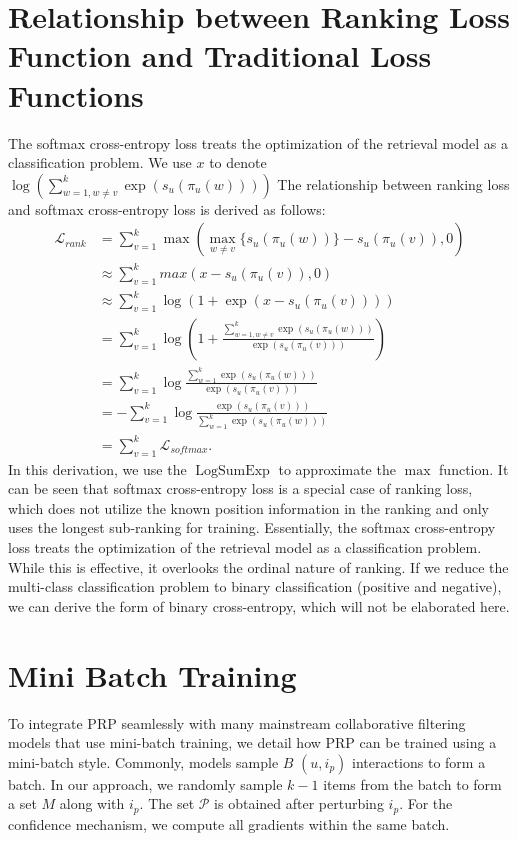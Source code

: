 \clearpage
\appendix
\section{Relationship between Ranking Loss Function and Traditional Loss Functions}
\label{app:relation}
The softmax cross-entropy loss treats the optimization of the retrieval model as a classification problem. We use $x$ to denote $\log(\sum_{w=1,w \neq v}^k \exp(s_u(\pi_{u}(w))))$ The relationship between ranking loss and softmax cross-entropy loss is derived as follows:
\begin{align}
    \mathcal{L}_{rank} &= \sum_{v=1}^{k} \max(\max_{w \neq v}\{s_u(\pi_{u}(w))\} - s_u(\pi_{u}(v)), 0) \\
    &\approx \sum_{v=1}^{k} max(x-s_u(\pi_{u}(v)),0) \\
    &\approx \sum_{v=1}^{k} \log(1 + \exp(x-s_u(\pi_{u}(v)))) \\
    & = \sum_{v=1}^{k} \log (1 + \frac{\sum_{w=1,w \neq v}^k \exp(s_u(\pi_{u}(w)))}{\exp(s_u(\pi_{u}(v)))}) \\
    & = \sum_{v=1}^{k} \log \frac{\sum_{w=1}^k \exp(s_u(\pi_{u}(w)))}{\exp(s_u(\pi_{u}(v)))}\\
    & = -\sum_{v=1}^{k} \log \frac{\exp(s_u(\pi_{u}(v)))}{\sum_{w=1}^k \exp(s_u(\pi_{u}(w)))} \\
    & = \sum_{v=1}^{k}\mathcal{L}_{softmax}.
\end{align}
In this derivation, we use the $\operatorname{LogSumExp}$ to approximate the $\max$ function. It can be seen that softmax cross-entropy loss is a special case of ranking loss, which does not utilize the known position information in the ranking and only uses the longest sub-ranking for training. Essentially, the softmax cross-entropy loss treats the optimization of the retrieval model as a classification problem. While this is effective, it overlooks the ordinal nature of ranking. If we reduce the multi-class classification problem to binary classification (positive and negative), we can derive the form of binary cross-entropy, which will not be elaborated here.

\section{Mini Batch Training}
\label{app:mini}
To integrate PRP seamlessly with many mainstream collaborative filtering models that use mini-batch training, we detail how PRP can be trained using a mini-batch style. Commonly, models sample $B$ $(u,i_p)$ interactions to form a batch. In our approach, we randomly sample $k-1$ items from the batch to form a set $M$ along with $i_p$. The set $\mathcal{P}$ is obtained after perturbing $i_p$. For the confidence mechanism, we compute all gradients within the same batch.

